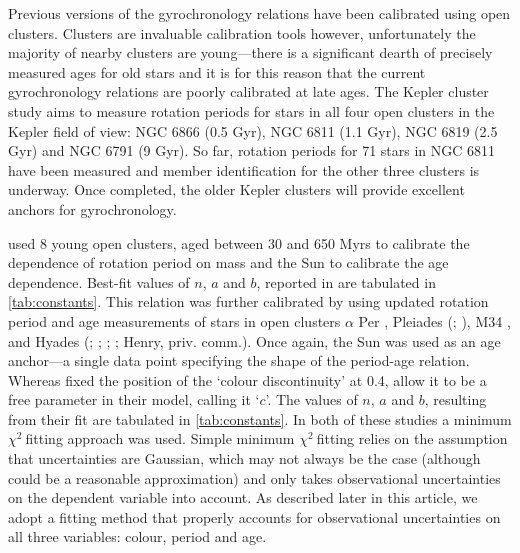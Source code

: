 \documentclass[10pt,preprint]{aastex}
\newcommand{\chit}{$\chi^2~$}
\begin{document}
Previous versions of the gyrochronology relations have been calibrated using open clusters.
Clusters are invaluable calibration tools however, unfortunately the majority of nearby clusters are young---there is a significant dearth of precisely measured ages for old stars and it is for this reason that the current gyrochronology relations are poorly calibrated at late ages.
The Kepler cluster study \citep{Meibom2011} aims to measure rotation periods for stars in all four open clusters in the Kepler field of view: NGC 6866 (0.5 Gyr), NGC 6811 (1.1 Gyr), NGC 6819 (2.5 Gyr) and NGC 6791 (9 Gyr).
So far, rotation periods for 71 stars in NGC 6811 have been measured and member identification for the other three clusters is underway.
Once completed, the older Kepler clusters will provide excellent anchors for gyrochronology.

\citet{Barnes2007} used 8 young open clusters, aged between 30 and 650 Myrs to calibrate the dependence of rotation period on mass and the Sun to calibrate the age dependence.
Best-fit values of $n$, $a$ and $b$, reported in \citet{Barnes2007} are tabulated in \ref{tab:constants}.
This relation was further calibrated by \citet{Mamajek2008} using updated rotation period and age measurements of stars in open clusters $\alpha$ Per \citep{Prosser1995}, Pleiades (\citealt{Prosser2005}; \citealt{Krishnamurthi1998}), M34 \citep{Meibom2011_M34}, and Hyades (\citealt{Radick1987}; \citealt{Prosser1995}; \citealt{Radick1995}; \citealt{Paulson2004}; Henry, priv. comm.).
Once again, the Sun was used as an age anchor---a single data point specifying the shape of the period-age relation.
Whereas \citet{Barnes2007} fixed the position of the `colour discontinuity' at 0.4, \citet{Mamajek2008} allow it to be a free parameter in their model, calling it `$c$'.
The values of $n$, $a$ and $b$, resulting from their fit are tabulated in \ref{tab:constants}.
In both of these studies a minimum \chit fitting approach was used.
Simple minimum \chit fitting relies on the assumption that uncertainties are Gaussian, which may not always be the case (although could be a reasonable approximation) and only takes observational uncertainties on the dependent variable into account.
As described later in this article, we adopt a fitting method that properly accounts for observational uncertainties on all three variables: colour, period and age.
\end{document}

